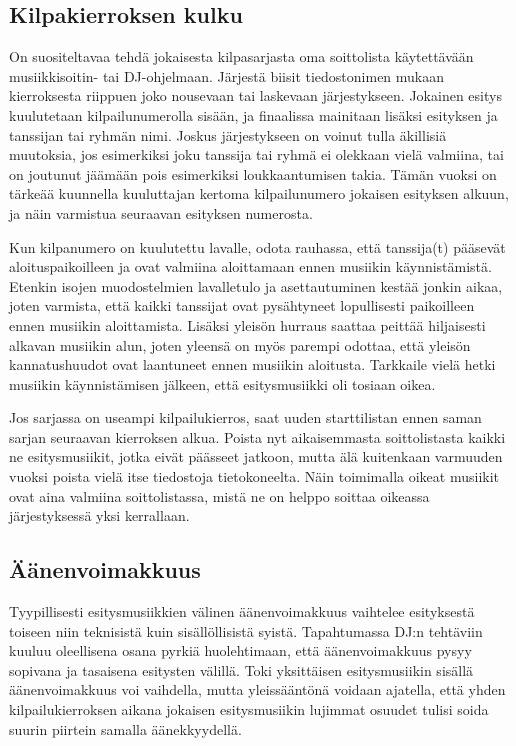 \documentclass[12pt, a4paper, oneside]{article}
\begin{document}
\subsection{Kilpakierroksen kulku}

On suositeltavaa tehdä jokaisesta kilpasarjasta oma soittolista käytettävään musiikkisoitin- tai DJ-ohjelmaan.
Järjestä biisit tiedostonimen mukaan kierroksesta riippuen joko nousevaan tai laskevaan järjestykseen.
Jokainen esitys kuulutetaan kilpailunumerolla sisään,
ja finaalissa mainitaan lisäksi esityksen ja tanssijan tai ryhmän nimi.
Joskus järjestykseen on voinut tulla äkillisiä muutoksia,
jos esimerkiksi joku tanssija tai ryhmä ei olekkaan vielä valmiina,
tai on joutunut jäämään pois esimerkiksi loukkaantumisen takia.
Tämän vuoksi on tärkeää kuunnella kuuluttajan kertoma kilpailunumero jokaisen esityksen alkuun,
ja näin varmistua seuraavan esityksen numerosta.

Kun kilpanumero on kuulutettu lavalle,
odota rauhassa,
että tanssija(t) pääsevät aloituspaikoilleen ja ovat valmiina aloittamaan ennen musiikin käynnistämistä.
Etenkin isojen muodostelmien lavalletulo ja asettautuminen kestää jonkin aikaa,
joten varmista,
että kaikki tanssijat ovat pysähtyneet lopullisesti paikoilleen ennen musiikin aloittamista.
Lisäksi yleisön hurraus saattaa peittää hiljaisesti alkavan musiikin alun,
joten yleensä on myös parempi odottaa,
että yleisön kannatushuudot ovat laantuneet ennen musiikin aloitusta.
Tarkkaile vielä hetki musiikin käynnistämisen jälkeen,
että esitysmusiikki oli tosiaan oikea.

Jos sarjassa on useampi kilpailukierros,
saat uuden starttilistan ennen saman sarjan seuraavan kierroksen alkua.
Poista nyt aikaisemmasta soittolistasta kaikki ne esitysmusiikit,
jotka eivät päässeet jatkoon,
mutta älä kuitenkaan varmuuden vuoksi poista vielä itse tiedostoja tietokoneelta.
Näin toimimalla oikeat musiikit ovat aina valmiina soittolistassa,
mistä ne on helppo soittaa oikeassa järjestyksessä yksi kerrallaan.

\subsection{Äänenvoimakkuus}

Tyypillisesti esitysmusiikkien välinen äänenvoimakkuus vaihtelee esityksestä toiseen niin teknisistä kuin sisällöllisistä syistä.
Tapahtumassa DJ:n tehtäviin kuuluu oleellisena osana pyrkiä huolehtimaan,
että äänenvoimakkuus pysyy sopivana ja tasaisena esitysten välillä.
Toki yksittäisen esitysmusiikin sisällä äänenvoimakkuus voi vaihdella,
mutta yleissääntönä voidaan ajatella,
että yhden kilpailukierroksen aikana jokaisen esitysmusiikin lujimmat osuudet tulisi soida suurin piirtein samalla äänekkyydellä.
\end{document}
